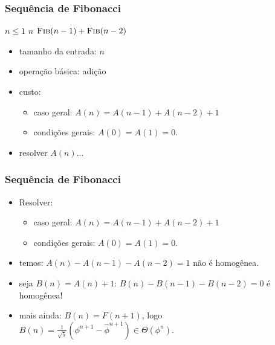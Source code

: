 \documentclass[handout]{beamer}
\begin{document}
\begin{frame}
\frametitle{Sequência de Fibonacci}

\begin{example}[Fibonacci]
\begin{codebox}
\li \If $n \le 1$  \Return $n$
\li \Else \Return $\textnormal{\scshape Fib}(n-1) + \textnormal{\scshape Fib}(n-2)$
\end{codebox}
\end{example}
\pause
\begin{itemize}
\item tamanho da entrada: $n$
\item operação básica: adição
\item custo:
\begin{itemize}
\item caso geral: $A(n) = A(n-1) + A(n-2) + 1$
\item condições gerais: $A(0) = A(1) = 0$.
\end{itemize}
\item resolver $A(n)$...
\end{itemize}
\end{frame}

\begin{frame}
\frametitle{Sequência de Fibonacci}

\begin{itemize}
\item Resolver:
\begin{itemize}
\item caso geral: $A(n) = A(n-1) + A(n-2) + 1$
\item condições gerais: $A(0) = A(1) = 0$.
\end{itemize}
\item temos: $A(n) - A(n-1) - A(n-2) = 1$ não é homogênea.
\item seja $B(n) = A(n)+1$: $B(n) - B(n-1) - B(n-2) = 0$ é homogênea!
\item mais ainda: $B(n) = F(n+1)$, logo $B(n) = \frac{1}{\sqrt{5}}(\phi^{n+1} - \hat{\phi}^{n+1}) \in \Theta(\phi^n)$.
\end{itemize}

\end{frame}
\end{document}
